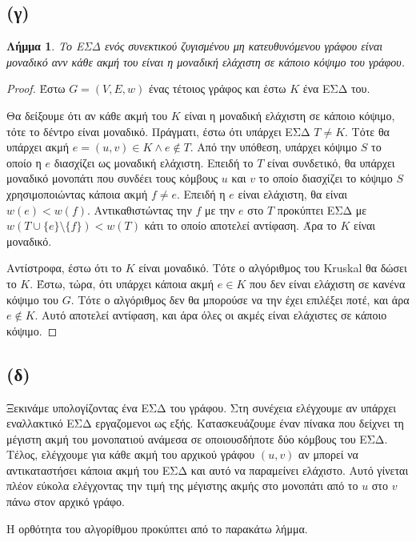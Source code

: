 \documentclass[11pt,a4paper,oneside]{report}
\newtheorem*{lemma}{Λήμμα}
\begin{document}
\subsection*{(γ)}
\begin{lemma}
Το ΕΣΔ ενός συνεκτικού ζυγισμένου μη κατευθυνόμενου γράφου είναι μοναδικό ανν κάθε ακμή του είναι η μοναδική ελάχιστη σε κάποιο κόψιμο του γράφου.
\end{lemma}

\begin{proof}
Έστω $G = (V, E, w)$ ένας τέτοιος γράφος και έστω $K$ ένα ΕΣΔ του.

Θα δείξουμε ότι αν κάθε ακμή του $K$ είναι η μοναδική ελάχιστη σε κάποιο κόψιμο, τότε το δέντρο είναι μοναδικό. Πράγματι, έστω ότι υπάρχει ΕΣΔ $T \neq K$. Τότε θα υπάρχει ακμή $e = (u, v) \in K \land e \not\in T$. Από την υπόθεση, υπάρχει κόψιμο $S$ το οποίο η $e$ διασχίζει ως μοναδική ελάχιστη. Επειδή το $T$ είναι συνδετικό, θα υπάρχει μοναδικό μονοπάτι που συνδέει τους κόμβους $u$ και $v$ το οποίο διασχίζει το κόψιμο $S$ χρησιμοποιώντας κάποια ακμή $f \neq e$. Επειδή η $e$ είναι ελάχιστη, θα είναι $w(e) < w(f)$. Αντικαθιστώντας την $f$ με την $e$ στο $T$ προκύπτει ΕΣΔ με $w( T \cup \{ e \} \setminus \{ f \} ) < w( T )$ κάτι το οποίο αποτελεί αντίφαση. Άρα το $K$ είναι μοναδικό.

Αντίστροφα, έστω ότι το $K$ είναι μοναδικό. Τότε ο αλγόριθμος του \textlatin{Kruskal} θα δώσει το $K$. Έστω, τώρα, ότι υπάρχει κάποια ακμή $e \in K$ που δεν είναι ελάχιστη σε κανένα κόψιμο του $G$. Τότε ο αλγόριθμος δεν θα μπορούσε να την έχει επιλέξει ποτέ, και άρα $e \not\in K$. Αυτό αποτελεί αντίφαση, και άρα όλες οι ακμές είναι ελάχιστες σε κάποιο κόψιμο.
\end{proof}

\subsection*{(δ)}
Ξεκινάμε υπολογίζοντας ένα ΕΣΔ του γράφου. Στη συνέχεια ελέγχουμε αν υπάρχει εναλλακτικό ΕΣΔ εργαζομενοι ως εξής. Κατασκευάζουμε έναν πίνακα που δείχνει τη μέγιστη ακμή του μονοπατιού ανάμεσα σε οποιουσδήποτε δύο κόμβους του ΕΣΔ. Τέλος, ελέγχουμε για κάθε ακμή του αρχικού γράφου $(u, v)$ αν μπορεί να αντικαταστήσει κάποια ακμή του ΕΣΔ και αυτό να παραμείνει ελάχιστο. Αυτό γίνεται πλέον εύκολα ελέγχοντας την τιμή της μέγιστης ακμής στο μονοπάτι από το $u$ στο $v$ πάνω στον αρχικό γράφο.

Η ορθότητα του αλγορίθμου προκύπτει από το παρακάτω λήμμα.
\end{document}
